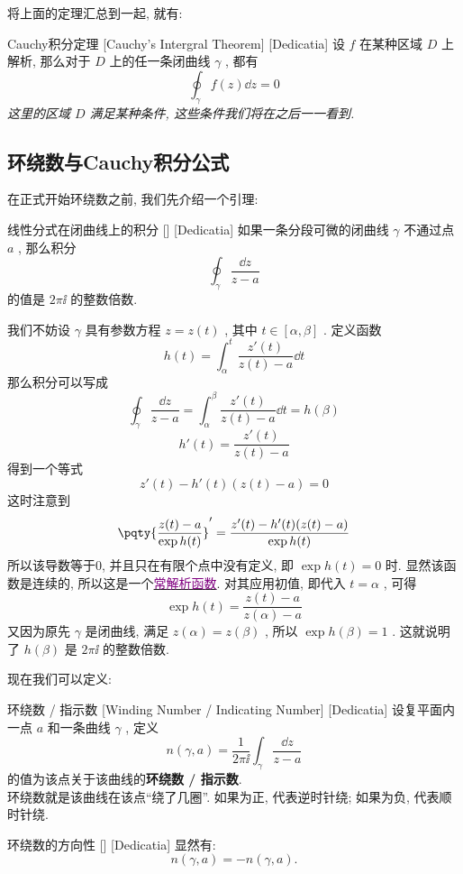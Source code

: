 \documentclass[UTF8]{ctexart}
\newcommand{\hyperrefc}[2]{\hyperref[#1]{\textcolor{purple}{#2}}}
\begin{document}
将上面的定理汇总到一起, 就有: 
\begin{thm}
    [Cauchy]
    {Cauchy积分定理}
    [Cauchy's Intergral Theorem]
    [Dedicatia]
    设 \( f \) 在某种区域 \( D \) 上解析, 那么对于 \( D \) 上的任一条闭曲线 \( \gamma \) , 都有
    \[\oint_\gamma f(z)\dd{z}=0\]
    \textit{这里的区域 \( D \) 满足某种条件, 这些条件我们将在之后一一看到. }
\end{thm}
\subsection{环绕数与Cauchy积分公式}
在正式开始环绕数之前, 我们先介绍一个引理:
\begin{lma}
    [UUID]
    {线性分式在闭曲线上的积分}
    []
    [Dedicatia]
    如果一条分段可微的闭曲线 \( \gamma \) 不通过点 \( a \) , 那么积分
    \[\oint_\gamma\frac{\dd{z}}{z-a} \]
    的值是 \( 2\pi\ii \) 的整数倍数. 
\end{lma}
\begin{prf}
    我们不妨设 \( \gamma \) 具有参数方程 \( z=z(t) \) , 其中 \( t\in[\alpha,\beta] \) . 定义函数
    \[h(t)=\int_\alpha^t \frac{z'(t)}{z(t)-a}\dd{t}\]
    那么积分可以写成
    \[\oint_\gamma\frac{\dd{z}}{z-a}=\int_\alpha^\beta \frac{z'(t)}{z(t)-a}\dd{t}=h(\beta)\]
    \[h'(t)=\frac{z'(t)}{z(t)-a}\]
    得到一个等式
    \[z'(t)-h'(t)(z(t)-a)=0\]
    这时注意到
    \[\pqty{\frac{z(t)-a}{\exp h(t)}}'=\frac{z'(t)-h'(t)(z(t)-a)}{\exp h(t)}\]
    所以该导数等于0, 并且只在有限个点中没有定义, 即 \( \exp h(t)=0 \) 时. 显然该函数是连续的, 所以这是一个\hyperrefc{ppt:TrivialAnalyticalFunction}{常解析函数}. 对其应用初值, 即代入 \( t=\alpha \) , 可得
    \[\exp h(t)=\frac{z(t)-a}{z(\alpha)-a}\]
    又因为原先 \( \gamma \) 是闭曲线, 满足 \( z(\alpha)=z(\beta) \) , 所以 \( \exp h(\beta)=1 \) . 这就说明了 \( h(\beta) \) 是 \( 2\pi\ii \) 的整数倍数. 
\end{prf}
现在我们可以定义: 
\begin{dfn}
    [WindingNumber]
    {环绕数 / 指示数}
    [Winding Number / Indicating Number]
    [Dedicatia]
    设复平面内一点 \( a \) 和一条曲线 \( \gamma \) , 定义
    \[n(\gamma, a)=\frac{1}{2\pi\ii}\int_\gamma\frac{\dd{z}}{z-a}\]
    的值为该点关于该曲线的\textbf{环绕数 / 指示数}.\\
    环绕数就是该曲线在该点“绕了几圈”. 如果为正, 代表逆时针绕; 如果为负, 代表顺时针绕. 
\end{dfn}
\begin{ppt}
    [UUID]
    {环绕数的方向性}
    []
    [Dedicatia]
    显然有: 
    \[n(\gamma,a)=-n(\gamma,a).\]
\end{ppt}
\end{document}
